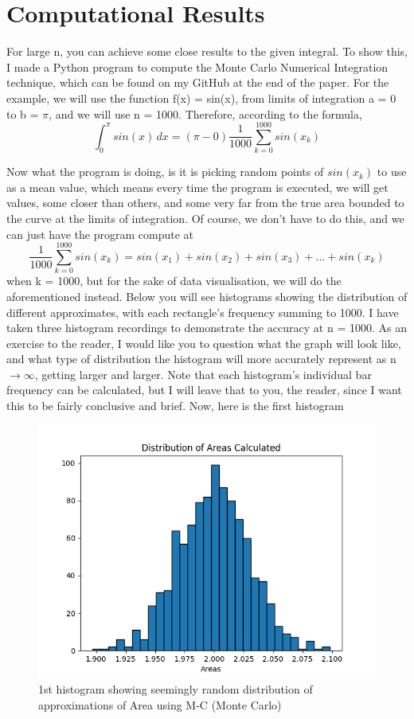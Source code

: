 \documentclass{article}
\begin{document}
\section{Computational Results}
For large n, you can achieve some close results to the given integral. To show this, I made a Python program to compute the Monte Carlo Numerical Integration technique, which can be found on my GitHub at the end of the paper. For the example, we will use the function f(x) = sin(x), from limits of integration a = 0 to b = $\pi$, and we will use n = 1000. Therefore, according to the formula,
$$\int_{0}^{\pi}{sin(x) \, dx} =  (\pi - 0)\frac{1}{1000}\sum_{k=0}^{1000}{sin(x_k)}$$

Now what the program is doing, is it is picking random points of $sin(x_k)$ to use as a mean value, which means every time the program is executed, we will get values, some closer than others, and some very far from the true area bounded to the curve at the limits of integration. Of course, we don't have to do this, and we can just have the program compute at
$$\frac{1}{1000}\sum_{k=0}^{1000}{sin(x_k)} = sin(x_1) + sin(x_2) + sin(x_3) + ... + sin(x_k)$$
when k = 1000, but for the sake of data visualisation, we will do the aforementioned instead.
Below you will see histograms showing the distribution of different approximates, with each rectangle's frequency summing to 1000. 
I have taken three histogram recordings to demonstrate the accuracy at n = 1000. As an exercise to the reader, I would like you to question what the graph will look like, and what type of distribution the histogram will more accurately represent as n $\rightarrow \infty$, getting larger and larger. Note that each histogram's individual bar frequency can be calculated, but I will leave that to you, the reader, since I want this to be fairly conclusive and brief. Now, here is the first histogram
\begin{figure}
    \centering
    \includegraphics[width=0.75\linewidth]{montecarlo.png}
    \caption{1st histogram showing seemingly random distribution of approximations of Area using M-C (Monte Carlo)}
\end{figure}
\end{document}
